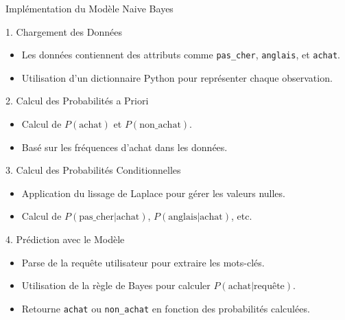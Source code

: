 \documentclass{beamer}
\begin{document}
\begin{frame}[allowframebreaks]{Implémentation du Modèle Naive Bayes}
    \begin{block}{1. Chargement des Données}
        \begin{itemize}
            \item Les données contiennent des attributs comme \texttt{pas\_cher}, \texttt{anglais}, et \texttt{achat}.
            \item Utilisation d'un dictionnaire Python pour représenter chaque observation.
        \end{itemize}
    \end{block}

    \begin{block}{2. Calcul des Probabilités a Priori}
        \begin{itemize}
            \item Calcul de \( P(\text{achat}) \) et \( P(\text{non\_achat}) \).
            \item Basé sur les fréquences d'achat dans les données.
        \end{itemize}
    \end{block}

    \begin{block}{3. Calcul des Probabilités Conditionnelles}
        \begin{itemize}
            \item Application du lissage de Laplace pour gérer les valeurs nulles.
            \item Calcul de \( P(\text{pas\_cher}|\text{achat}) \), \( P(\text{anglais}|\text{achat}) \), etc.
        \end{itemize}
    \end{block}

    \begin{block}{4. Prédiction avec le Modèle}
        \begin{itemize}
            \item Parse de la requête utilisateur pour extraire les mots-clés.
            \item Utilisation de la règle de Bayes pour calculer \( P(\text{achat}|\text{requête}) \).
            \item Retourne \texttt{achat} ou \texttt{non\_achat} en fonction des probabilités calculées.
        \end{itemize}
    \end{block}
\end{frame}
\end{document}
